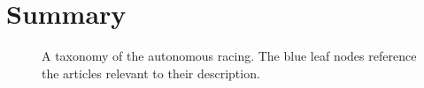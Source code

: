 \section{Summary}

\begin{figure}
    \centering
    
    \caption[A taxonomy of the autonomous racing literature with articles]{A taxonomy of the autonomous racing. The blue leaf nodes reference the articles relevant to their description.}
    \label{fig:literature_taxonomy_1}
\end{figure}
